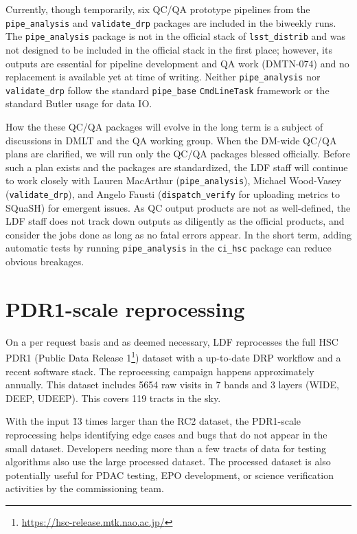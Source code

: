 \documentclass[DM,authoryear,toc]{lsstdoc}
\begin{document}
Currently, though temporarily, six QC/QA prototype pipelines from the
\texttt{pipe\_analysis} and \texttt{validate\_drp} packages are included in
the biweekly runs. The \texttt{pipe\_analysis} package is not in the official
stack of \texttt{lsst\_distrib} and was not designed to be included in the
official stack in the first place; however, its outputs are essential
for pipeline development and QA work (DMTN-074) and no replacement
is available yet at time of writing.  Neither \texttt{pipe\_analysis} nor
\texttt{validate\_drp} follow the standard \texttt{pipe\_base}
\texttt{CmdLineTask} framework or the standard Butler usage for data IO.

How the these QC/QA packages will evolve in the long term is a
subject of discussions in DMLT and the QA working group. When the
DM-wide QC/QA plans are clarified, we will run only the QC/QA packages
blessed officially. Before such a plan exists and the packages are
standardized, the LDF staff will continue to work closely with Lauren MacArthur
(\texttt{pipe\_analysis}), Michael Wood-Vasey (\texttt{validate\_drp}), and
Angelo Fausti (\texttt{dispatch\_verify} for uploading metrics to SQuaSH) for
emergent issues.  As QC output products are not as well-defined, the LDF
staff does not track down outputs as diligently as the official products,
and consider the jobs done as long as no fatal errors appear.  In
the short term, adding automatic tests by running \texttt{pipe\_analysis}
in the \texttt{ci\_hsc} package can reduce obvious breakages.

\section{PDR1-scale reprocessing}
\label{sec:pdr1}

On a per request basis and as deemed necessary, LDF reprocesses the
full HSC PDR1 (Public Data Release 1\footnote{\url{https://hsc-release.mtk.nao.ac.jp/}})
dataset with a up-to-date DRP
workflow and a recent software stack. The reprocessing campaign
happens approximately annually. This dataset includes 5654 raw
visits in 7 bands and 3 layers (WIDE, DEEP, UDEEP). This covers 119
tracts in the sky.

With the input \~13 times larger than the RC2 dataset, the PDR1-scale
reprocessing helps identifying edge cases and bugs that do not
appear in the small dataset.  Developers needing more than a few
tracts of data for testing algorithms also use the large processed
dataset. The processed dataset is also potentially useful for PDAC
testing, EPO development, or science verification activities by the
commissioning team.
\end{document}
